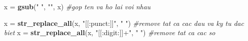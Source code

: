 \documentclass[]{article}
\newenvironment{Shaded}{\begin{snugshade}}{\end{snugshade}}
\newcommand{\CommentTok}[1]{\textcolor[rgb]{0.56,0.35,0.01}{\textit{#1}}}
\newcommand{\KeywordTok}[1]{\textcolor[rgb]{0.13,0.29,0.53}{\textbf{#1}}}
\newcommand{\NormalTok}[1]{#1}
\newcommand{\StringTok}[1]{\textcolor[rgb]{0.31,0.60,0.02}{#1}}
\begin{document}
\begin{Shaded}
\begin{Highlighting}[]
\NormalTok{x =}\StringTok{  }\KeywordTok{gsub}\NormalTok{(}\StringTok{" "}\NormalTok{, }\StringTok{""}\NormalTok{, x) }\CommentTok{#gop ten va ho lai voi nhau}
\end{Highlighting}
\end{Shaded}

\begin{Shaded}
\begin{Highlighting}[]
\NormalTok{x  =}\StringTok{ }\KeywordTok{str_replace_all}\NormalTok{(x, }\StringTok{"[[:punct:]]"}\NormalTok{, }\StringTok{" "}\NormalTok{) }\CommentTok{#remove tat ca cac dau va ky tu dac biet}
\NormalTok{x  =}\StringTok{ }\KeywordTok{str_replace_all}\NormalTok{(x, }\StringTok{"[[:digit:]]+"}\NormalTok{, }\StringTok{" "}\NormalTok{) }\CommentTok{#remove tat ca cac so}
\end{Highlighting}
\end{Shaded}
\end{document}
